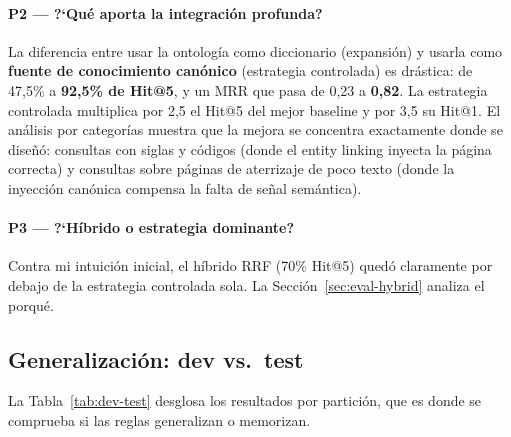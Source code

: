 \documentclass[12pt, a4paper, twoside]{report}
\begin{document}
\paragraph{P2 --- ?`Qu\'e aporta la integraci\'on profunda?} La diferencia entre usar la ontolog\'ia como diccionario (expansi\'on) y usarla como \textbf{fuente de conocimiento can\'onico} (estrategia controlada) es dr\'astica: de 47,5\% a \textbf{92,5\% de Hit@5}, y un MRR que pasa de 0,23 a \textbf{0,82}. La estrategia controlada multiplica por 2,5 el Hit@5 del mejor baseline y por 3,5 su Hit@1. El an\'alisis por categor\'ias muestra que la mejora se concentra exactamente donde se dise\~n\'o: consultas con siglas y c\'odigos (donde el entity linking inyecta la p\'agina correcta) y consultas sobre p\'aginas de aterrizaje de poco texto (donde la inyecci\'on can\'onica compensa la falta de se\~nal sem\'antica).

\paragraph{P3 --- ?`H\'ibrido o estrategia dominante?} Contra mi intuici\'on inicial, el h\'ibrido RRF (70\% Hit@5) qued\'o claramente por debajo de la estrategia controlada sola. La Secci\'on~\ref{sec:eval-hybrid} analiza el porqu\'e.

\subsection{Generalizaci\'on: dev vs.\ test}
\label{sec:dev-test}

La Tabla~\ref{tab:dev-test} desglosa los resultados por partici\'on, que es donde se comprueba si las reglas generalizan o memorizan.
\end{document}

